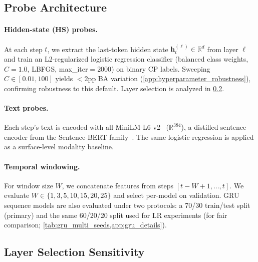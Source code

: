 \subsection{Probe Architecture}
\label{sec:probe-architecture}

\paragraph{Hidden-state (HS) probes.} At each step $t$, we extract the last-token hidden state $\mathbf{h}_t^{(\ell)} \in \mathbb{R}^d$ from layer $\ell$ and train an L2-regularized logistic regression classifier (balanced class weights, $C{=}1.0$, LBFGS, max\_iter${}=2000$) on binary CP labels. Sweeping $C \in [0.01, 100]$ yields $<$2pp BA variation (\cref{app:hyperparameter_robustness}), confirming robustness to this default. Layer selection is analyzed in \cref{sec:layer-sensitivity}.

\paragraph{Text probes.} Each step's text is encoded with all-MiniLM-L6-v2~\citep{wang2020minilm} ($\mathbb{R}^{384}$), a distilled sentence encoder from the Sentence-BERT family~\citep{reimers2019sentence}. The same logistic regression is applied as a surface-level modality baseline.

\paragraph{Temporal windowing.} For window size $W$, we concatenate features from steps $[t{-}W{+}1, \ldots, t]$. We evaluate $W \in \{1, 3, 5, 10, 15, 20, 25\}$ and select per-model on validation. GRU sequence models are also evaluated under two protocols: a 70/30 train/test split (primary) and the same 60/20/20 split used for LR experiments (for fair comparison; \cref{tab:gru_multi_seeds,app:gru_details}).

\subsection{Layer Selection Sensitivity}
\label{sec:layer-sensitivity}

